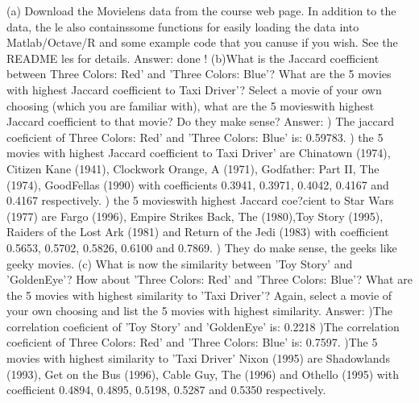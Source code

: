 \documentclass[paper=a4, fontsize=11pt]{scrartcl} %
\numberwithin{equation}{section} %
\numberwithin{figure}{section} %
\numberwithin{table}{section} %
\begin{document}
(a) Download the Movielens data from the course web page. In addition to the data, the le also containssome functions for easily loading the data into Matlab/Octave/R and some example code that you canuse if you wish. See the README les for details.
\newline
\newline
Answer:
\newline
done !
\newline
\newline
(b)What is the Jaccard coefficient between Three Colors: Red' and 'Three Colors: Blue'? What are the 5 movies with highest Jaccard coefficient to Taxi Driver'? Select a movie of your own choosing (which you are familiar with), what are the 5 movieswith highest Jaccard coefficient to that movie? Do they make sense?
\newline
\newline
Answer:
) The jaccard coeficient of Three Colors: Red' and 'Three Colors: Blue' is: 0.59783. 
) the 5 movies with highest Jaccard coefficient to Taxi Driver' are Chinatown (1974), Citizen Kane (1941), Clockwork Orange, A (1971), Godfather: Part II, The (1974), GoodFellas (1990) with coefficients 0.3941, 0.3971, 0.4042, 0.4167 and 0.4167 respectively. 
)  the 5 movieswith highest Jaccard coe?cient to Star Wars (1977) are Fargo (1996), Empire Strikes Back, The (1980),Toy Story (1995), Raiders of the Lost Ark (1981) and Return of the Jedi (1983) with coefficient  0.5653, 0.5702, 0.5826, 0.6100 and 0.7869. 
) They do make sense, the geeks like geeky movies.
\newline
\newline
(c) What is now the similarity between 'Toy Story' and 'GoldenEye'? How about 'Three Colors: Red' and 'Three Colors: Blue'? What are the 5 movies with highest similarity to 'Taxi Driver'? Again, select a movie of your own choosing and list the 5 movies with highest similarity.
\newline
\newline
Answer:
)The correlation coeficient of 'Toy Story' and 'GoldenEye' is: 0.2218  
)The correlation coeficient of Three Colors: Red' and 'Three Colors: Blue' is: 0.7597. 
)The 5 movies with highest similarity to 'Taxi Driver' Nixon (1995) are Shadowlands (1993), Get on the Bus (1996), Cable Guy, The (1996) and Othello (1995) with coefficient  0.4894, 0.4895, 0.5198, 0.5287 and 0.5350 respectively. 
\end{document}
